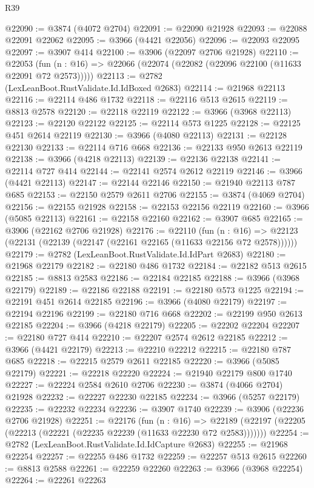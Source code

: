\begin{lexlean}{R39}
\begin{coremodule}
@22090 := @3874 (@4072 @2704)
@22091 := @22090 @21928
@22093 := @22088 @22091 @22062
@22095 := @3966 (@4421 @22056)
@22096 := @22093 @22095
@22097 := @3907 @414
@22100 := @3906 (@22097 @2706 @21928)
@22110 := @22053
    (fun (n : @16) => @22066 (@22074 (@22082 (@22096 @22100 (@11633 @22091 @72 @2573)))))
@22113 := @2782 (LexLeanBoot.RustValidate.Id.IdBoxed @2683)
@22114 := @21968 @22113
@22116 := @22114 @486 @1732
@22118 := @22116 @513 @2615
@22119 := @8813 @2578
@22120 := @22118 @22119
@22122 := @3966 (@3968 @22113)
@22123 := @22120 @22122
@22125 := @22114 @573 @1225
@22128 := @22125 @451 @2614 @22119
@22130 := @3966 (@4080 @22113)
@22131 := @22128 @22130
@22133 := @22114 @716 @668
@22136 := @22133 @950 @2613 @22119
@22138 := @3966 (@4218 @22113)
@22139 := @22136 @22138
@22141 := @22114 @727 @414
@22144 := @22141 @2574 @2612 @22119
@22146 := @3966 (@4421 @22113)
@22147 := @22144 @22146
@22150 := @21940 @22113 @787 @685
@22153 := @22150 @2579 @2611 @2706
@22155 := @3874 (@4069 @2704)
@22156 := @22155 @21928
@22158 := @22153 @22156 @22119
@22160 := @3966 (@5085 @22113)
@22161 := @22158 @22160
@22162 := @3907 @685
@22165 := @3906 (@22162 @2706 @21928)
@22176 := @22110
    (fun (n : @16) => @22123 (@22131 (@22139 (@22147 (@22161 @22165 (@11633 @22156 @72 @2578))))))
@22179 := @2782 (LexLeanBoot.RustValidate.Id.IdPart @2683)
@22180 := @21968 @22179
@22182 := @22180 @486 @1732
@22184 := @22182 @513 @2615
@22185 := @8813 @2583
@22186 := @22184 @22185
@22188 := @3966 (@3968 @22179)
@22189 := @22186 @22188
@22191 := @22180 @573 @1225
@22194 := @22191 @451 @2614 @22185
@22196 := @3966 (@4080 @22179)
@22197 := @22194 @22196
@22199 := @22180 @716 @668
@22202 := @22199 @950 @2613 @22185
@22204 := @3966 (@4218 @22179)
@22205 := @22202 @22204
@22207 := @22180 @727 @414
@22210 := @22207 @2574 @2612 @22185
@22212 := @3966 (@4421 @22179)
@22213 := @22210 @22212
@22215 := @22180 @787 @685
@22218 := @22215 @2579 @2611 @22185
@22220 := @3966 (@5085 @22179)
@22221 := @22218 @22220
@22224 := @21940 @22179 @800 @1740
@22227 := @22224 @2584 @2610 @2706
@22230 := @3874 (@4066 @2704) @21928
@22232 := @22227 @22230 @22185
@22234 := @3966 (@5257 @22179)
@22235 := @22232 @22234
@22236 := @3907 @1740
@22239 := @3906 (@22236 @2706 @21928)
@22251 := @22176
    (fun (n : @16) =>
    @22189 (@22197 (@22205 (@22213 (@22221 (@22235 @22239 (@11633 @22230 @72 @2583)))))))
@22254 := @2782 (LexLeanBoot.RustValidate.Id.IdCapture @2683)
@22255 := @21968 @22254
@22257 := @22255 @486 @1732
@22259 := @22257 @513 @2615
@22260 := @8813 @2588
@22261 := @22259 @22260
@22263 := @3966 (@3968 @22254)
@22264 := @22261 @22263

\end{coremodule}
\end{lexlean}
